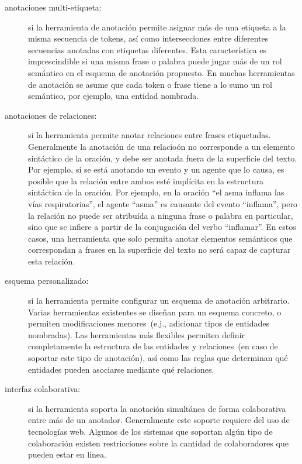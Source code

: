 \begin{description}
  \item[anotaciones multi-etiqueta:] si la herramienta de anotación permite asignar más de una etiqueta a la misma secuencia de tokens, así como intersecciones entre diferentes secuencias anotadas con etiquetas diferentes. Esta característica es imprescindible si una misma frase o palabra puede jugar más de un rol semántico en el esquema de anotación propuesto. En muchas herramientas de anotación se asume que cada token o frase tiene a lo sumo un rol semántico, por ejemplo, una entidad nombrada.
  \item[anotaciones de relaciones:] si la herramienta permite anotar relaciones entre frases etiquetadas. Generalmente la anotación de una relacioón no corresponde a un elemento sintáctico de la oración, y debe ser anotada fuera de la superficie del texto. Por ejemplo, si se está anotando un evento y un agente que lo causa, es posible que la relación entre ambos esté implícita en la estructura sintáctica de la oración. Por ejemplo, en la oración ``el asma inflama las vías respiratorias'', el agente ``asma'' es causante del evento ``inflama'', pero la relación no puede ser atribuída a ninguna frase o palabra en particular, sino que se infiere a partir de la conjugación del verbo ``inflamar''. En estos casos, una herramienta que solo permita anotar elementos semánticos que correspondan a frases en la superficie del texto no será capaz de capturar esta relación.
  \item[esquema personalizado:] si la herramienta permite configurar un esquema de anotación arbitrario. Varias herramientas existentes se diseñan para un esquema concreto, o permiten modificaciones menores~(e.j., adicionar tipos de entidades nombradas). Las herramientas más flexibles permiten definir completamente la estructura de las entidades y relaciones~(en caso de soportar este tipo de anotación), así como las reglas que determinan qué entidades pueden asociarse mediante qué relaciones.
  \item[interfaz colaborativa:] si la herramienta soporta la anotación simultánea de forma colaborativa entre más de un anotador. Generalmente este soporte requiere del uso de tecnologías web. Algunos de los sistemas que soportan algún tipo de colaboración existen restricciones sobre la cantidad de colaboradores que pueden estar en línea.

\end{description}
